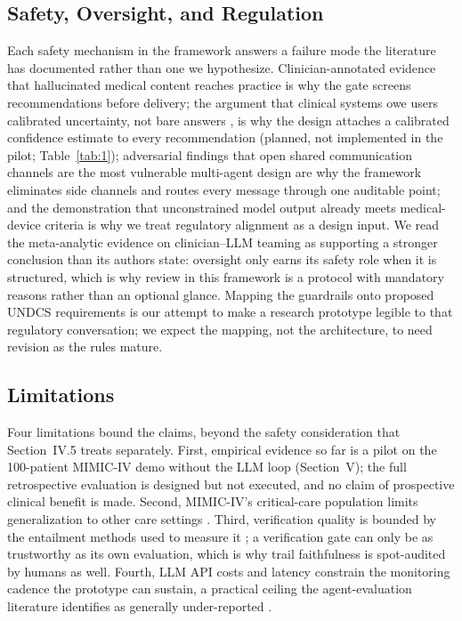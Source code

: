 \subsection{Safety, Oversight, and Regulation}

Each safety mechanism in the framework answers a failure mode the literature has documented
rather than one we hypothesize. Clinician-annotated evidence that hallucinated medical
content reaches practice \cite{kim2025hallucinations} is why the gate screens recommendations
before delivery; the argument that clinical systems owe users calibrated uncertainty, not
bare answers \cite{atf2025uncertainty}, is why the design attaches a calibrated confidence
estimate to every recommendation (planned, not implemented in the pilot; Table~\ref{tab:1});
adversarial findings that open shared communication channels are the most vulnerable
multi-agent design \cite{chen2025medsentry} are why the framework eliminates side channels and
routes every message through one auditable point; and the
demonstration that unconstrained model output already meets medical-device criteria
\cite{weissman2025unregulated} is why we treat regulatory alignment as a design input. We read
the meta-analytic evidence on clinician--LLM teaming \cite{wang2026collaboration} as supporting a
stronger conclusion than its authors state: oversight only earns its safety role when it is
structured, which is why review in this framework is a protocol with mandatory reasons
rather than an optional glance. Mapping the guardrails onto proposed UNDCS requirements
\cite{tan2026undcs} is our attempt to make a research prototype legible to that regulatory
conversation; we expect the mapping, not the architecture, to need revision as the rules
mature.

\subsection{Limitations}

Four limitations bound the claims, beyond the safety consideration that Section~IV.5 treats
separately. First, empirical evidence so far is a pilot on the
100-patient MIMIC-IV demo without the LLM loop (Section~V); the full retrospective evaluation
is designed but not executed, and no claim of prospective clinical benefit is made. Second,
MIMIC-IV's critical-care population limits
generalization to other care settings \cite{johnson2023mimic}. Third, verification quality is
bounded by the entailment methods used to measure it \cite{es2024ragas}; a verification gate can
only be as trustworthy as its own evaluation, which is why trail faithfulness is spot-audited
by humans as well. Fourth, LLM API costs and latency constrain the monitoring cadence the
prototype can sustain, a practical ceiling the agent-evaluation literature identifies as
generally under-reported \cite{yehudai2025evaluation}.

